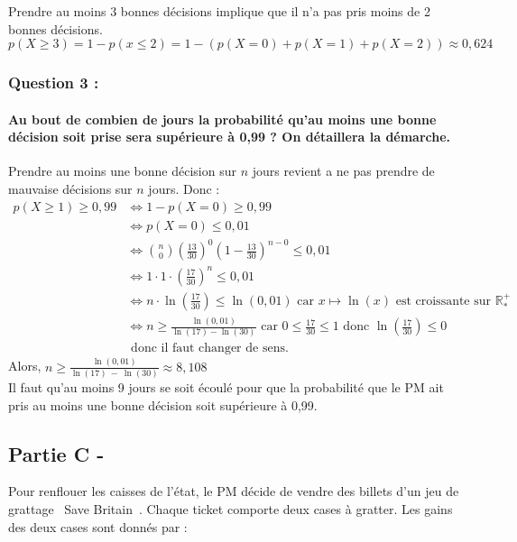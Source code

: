 \documentclass[a4paper, 12pt]{article}
\begin{document}
Prendre au moins 3 bonnes décisions implique que il n'a pas pris moins de 2 bonnes décisions.\\
$p(X \geq 3) = 1 - p(x \leq 2) = 1- \left( p(X=0) + p(X = 1) + p(X = 2)\right) \approx 0,624$

{}
\subsubsection*{Question 3 :}
\paragraph*{Au bout de combien de jours la probabilité qu'au moins une bonne décision soit prise sera supérieure à 0,99 ? On détaillera la démarche.\\[5mm]}

Prendre au moins une bonne décision sur $n$ jours revient a ne pas prendre de mauvaise décisions sur $n$ jours. Donc : \\
$\begin{aligned}
p(X \geq 1) \geq 0,99 &\iff 1 - p(X = 0) \geq 0,99 \\
&\iff p(X = 0) \leq 0,01 \\
&\iff \binom{n}{0} \left( \frac{13}{30}\right)^0 \left(1 - \frac{13}{30}\right)^{n-0} \leq 0,01 \\
&\iff 1 \cdot 1 \cdot \left(\frac{17}{30} \right)^n \leq 0,01 \\
&\iff n \cdot \ln{\left( \frac{17}{30} \right) } \leq \ln{\left(0,01\right)} \text{ car } x \mapsto \ln{\left(x\right)} \text{ est croissante sur } \mathds{R}^+_*\\
&\iff n  \geq \frac{\ln{\left(0,01\right)}}{\ln{\left(17\right)}-\ln{\left(30\right)}} \text{ car } 0 \leq \frac{17}{30} \leq 1 
    \text{ donc } \ln{\left(\frac{17}{30}\right)} \leq 0 \\
& \text{ donc il faut changer de sens.}
\end{aligned}$
\\[2mm]
Alors, $n \geq \frac{\ln{\left(0,01\right)}}{\ln{\left(17\right)}\ -\ \ln{\left(30\right)}} \approx 8,108 $
\\
Il faut qu'au moins 9 jours se soit écoulé pour que la probabilité que le PM ait pris au moins une bonne décision soit supérieure à 0,99.

{}
\subsection*{Partie C -}
Pour renflouer les caisses de l'état, le PM décide de vendre des billets d'un jeu de grattage \guillemotleft\ Save Britain\ \guillemotright. Chaque ticket comporte deux cases à gratter. 
Les gains des deux cases sont donnés par : 
\\
\end{document}
